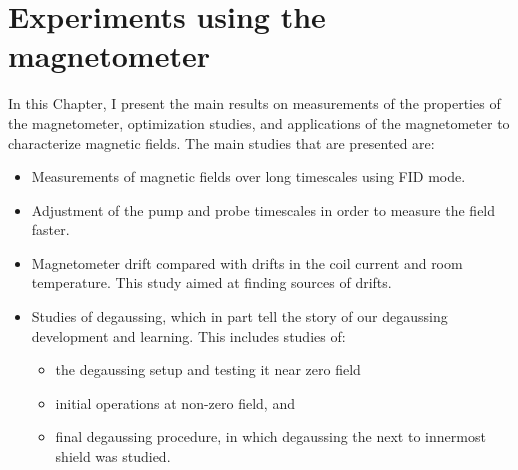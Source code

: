 \chapter{Experiments using the magnetometer\label{ch:results}}

In this Chapter, I present the main results on measurements of the
properties of the magnetometer, optimization studies, and applications
of the magnetometer to characterize magnetic fields.  The main studies
that are presented are:
\begin{itemize}
\item Measurements of magnetic fields over long timescales using FID mode.
\item Adjustment of the pump and probe timescales in order to measure
  the field faster.
\item Magnetometer drift compared with drifts in the coil current and
  room temperature.  This study aimed at finding sources of drifts.
\item Studies of degaussing, which in part tell the story of our
  degaussing development and learning.  This includes studies of:
  \begin{itemize}
    \item the degaussing setup and testing it near zero field
    \item initial operations at non-zero field, and
    \item final degaussing procedure, in which degaussing the next to
      innermost shield was studied.
  \end{itemize}

\end{itemize}
